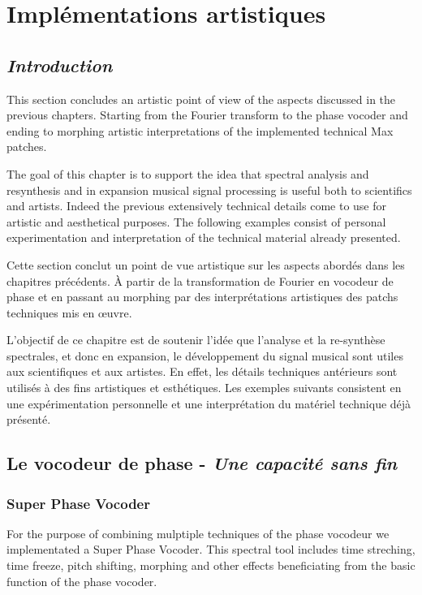 \chapter{Implémentations artistiques}

\label{ch:Implémentations aristiques}

\section{\textit{Introduction}}


This section concludes an artistic point of view of the aspects discussed in the previous chapters. Starting from the Fourier transform to the phase vocoder and ending to morphing artistic interpretations of the implemented technical Max patches.

The goal of this chapter is to support the idea that spectral analysis and resynthesis and in expansion musical signal processing is useful both to scientifics and artists. Indeed the previous extensively technical details come to use for artistic and aesthetical purposes. The following examples consist of personal experimentation and interpretation of the technical material already presented.


Cette section conclut un point de vue artistique sur les aspects abordés dans les chapitres précédents. À partir de la transformation de Fourier en vocodeur de phase et en passant au morphing par des interprétations artistiques des patchs techniques mis en œuvre.

L'objectif de ce chapitre est de soutenir l'idée que l'analyse et la re-synthèse spectrales, et donc en expansion, le développement du signal musical  sont utiles aux scientifiques et aux artistes. En effet, les détails techniques antérieurs sont utilisés à des fins artistiques et esthétiques. Les exemples suivants consistent en une expérimentation personnelle et une interprétation du matériel technique déjà présenté.

\section{Le vocodeur de phase - \textit{Une capacité sans fin}}

\subsection{Super Phase Vocoder}

For the purpose of combining mulptiple techniques of the phase vocodeur we implementated a Super Phase Vocoder. This spectral tool includes time streching, time freeze, pitch shifting, morphing and other effects beneficiating from the basic function of the phase vocoder.


